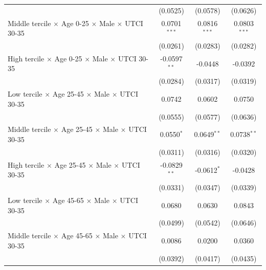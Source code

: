 \begin{table}[htbp]
\begin{tabular}{lccc}
                                                                                & (0.0525)        & (0.0578)          & (0.0626)\\   
      Middle tercile $\times$ Age 0-25 $\times$ Male $\times$ UTCI 30-35        & 0.0701$^{***}$  & 0.0816$^{***}$    & 0.0803$^{***}$\\   
                                                                                & (0.0261)        & (0.0283)          & (0.0282)\\   
      High tercile $\times$ Age 0-25 $\times$ Male $\times$ UTCI 30-35          & -0.0597$^{**}$  & -0.0448           & -0.0392\\   
                                                                                & (0.0284)        & (0.0317)          & (0.0319)\\   
      Low tercile $\times$ Age 25-45 $\times$ Male $\times$ UTCI 30-35          & 0.0742          & 0.0602            & 0.0750\\   
                                                                                & (0.0555)        & (0.0577)          & (0.0636)\\   
      Middle tercile $\times$ Age 25-45 $\times$ Male $\times$ UTCI 30-35       & 0.0550$^{*}$    & 0.0649$^{**}$     & 0.0738$^{**}$\\   
                                                                                & (0.0311)        & (0.0316)          & (0.0320)\\   
      High tercile $\times$ Age 25-45 $\times$ Male $\times$ UTCI 30-35         & -0.0829$^{**}$  & -0.0612$^{*}$     & -0.0428\\   
                                                                                & (0.0331)        & (0.0347)          & (0.0339)\\   
      Low tercile $\times$ Age 45-65 $\times$ Male $\times$ UTCI 30-35          & 0.0680          & 0.0630            & 0.0843\\   
                                                                                & (0.0499)        & (0.0542)          & (0.0646)\\   
      Middle tercile $\times$ Age 45-65 $\times$ Male $\times$ UTCI 30-35       & 0.0086          & 0.0200            & 0.0360\\   
                                                                                & (0.0392)        & (0.0417)          & (0.0435)\\   

\end{tabular}
\end{table}
